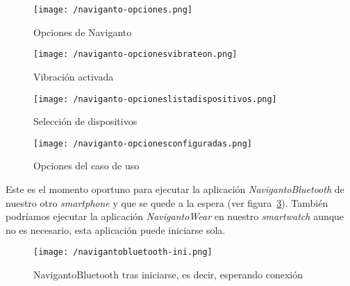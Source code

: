 \begin{figure}[!h]
  \begin{minipage}[b]{0.5\linewidth}
    \begin{center}
      \texttt{[image: /naviganto-opciones.png]}
      \caption{Opciones de Naviganto}
      \label{fig:navigantoOpciones}
    \end{center}
  \end{minipage}
  \begin{minipage}[b]{0.5\linewidth}
    \begin{center}
      \texttt{[image: /naviganto-opcionesvibrateon.png]}
      \caption{Vibración activada}
      \label{fig:navignatoOpcionesVibrateOn}
    \end{center}
  \end{minipage}
\end{figure}

\begin{figure}[!h]
  \begin{minipage}[b]{0.5\linewidth}
    \begin{center}
      \texttt{[image: /naviganto-opcioneslistadispositivos.png]}
      \caption{Selección de dispositivos}
      \label{fig:navigantoOpcionesSelecionaDispositivos}
    \end{center}
  \end{minipage}
  \begin{minipage}[b]{0.5\linewidth}
    \begin{center}
      \texttt{[image: /naviganto-opcionesconfiguradas.png]}
      \caption{Opciones del caso de uso}
      \label{fig:navigantoOpcionesCasoDeUso}
    \end{center}
  \end{minipage}
\end{figure}

Este es el momento oportuno para ejecutar la aplicación \emph{NavigantoBluetooth} de nuestro otro
\emph{smartphone} y que se quede a la espera (ver
figura~\ref{fig:navigantoBluetoothIniciado}). También podríamos ejecutar la aplicación
\emph{NavigantoWear} en nuestro \emph{smartwatch} aunque no es necesario, esta aplicación puede
iniciarse sola.

\begin{figure}[!h]
  \begin{center}
    \texttt{[image: /navigantobluetooth-ini.png]}
    \caption{NavigantoBluetooth tras iniciarse, es decir, esperando conexión}
    \label{fig:navigantoBluetoothIniciado}
  \end{center}
\end{figure}

